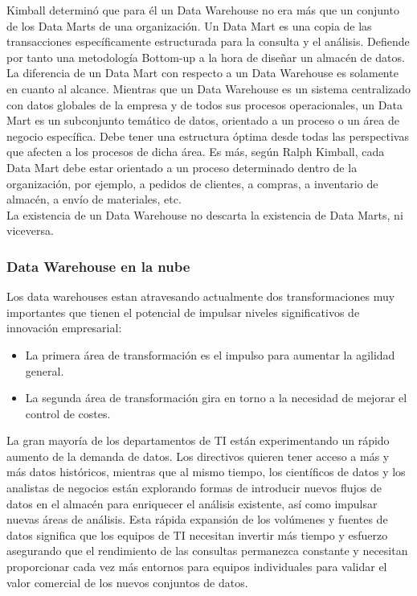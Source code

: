 \documentclass[%
 reprint,
 amsmath,amssymb,
 aps,
]{revtex4-1}
\begin{document}
Kimball determinó que para él un Data Warehouse no era más que un conjunto de los Data Marts de una organización. Un Data Mart es una copia de las transacciones específicamente estructurada para la consulta y el análisis. Defiende por tanto una metodología Bottom-up a la hora de diseñar un almacén de datos. \cite{referenciaestrella2}\\

La diferencia de un Data Mart con respecto a un Data Warehouse es solamente en cuanto al alcance. Mientras que un Data Warehouse es un sistema centralizado con datos globales de la empresa y de todos sus procesos operacionales, un Data Mart es un subconjunto temático de datos, orientado a un proceso o un área de negocio específica. Debe tener una estructura óptima desde todas las perspectivas que afecten a los procesos de dicha área. Es más, según Ralph Kimball, cada Data Mart debe estar orientado a un proceso determinado dentro de la organización, por ejemplo, a pedidos de clientes, a compras, a inventario de almacén, a envío de materiales, etc.\\

 La existencia de un Data Warehouse no descarta la existencia de Data Marts, ni viceversa.  \cite{referenciaestrella3}


\subsubsection{\textbf{Data Warehouse en la nube}}

Los data warehouses estan atravesando actualmente dos transformaciones muy importantes que tienen el potencial de impulsar niveles significativos de innovación empresarial:


\begin{itemize}
	\item La primera área de transformación es el impulso para aumentar la agilidad general.
	\item La segunda área de transformación gira en torno a la necesidad de mejorar el control de costes.
\end{itemize}

La gran mayoría de los departamentos de TI están experimentando un rápido aumento de la demanda de datos. Los directivos quieren tener acceso a más y más datos históricos, mientras que al mismo tiempo, los científicos de datos y los analistas de negocios están explorando formas de introducir nuevos flujos de datos en el almacén para enriquecer el análisis existente, así como impulsar nuevas áreas de análisis. Esta rápida expansión de los volúmenes y fuentes de datos significa que los equipos de TI necesitan invertir más tiempo y esfuerzo asegurando que el rendimiento de las consultas permanezca constante y necesitan proporcionar cada vez más entornos para equipos individuales para validar el valor comercial de los nuevos conjuntos de datos.\\
\end{document}

